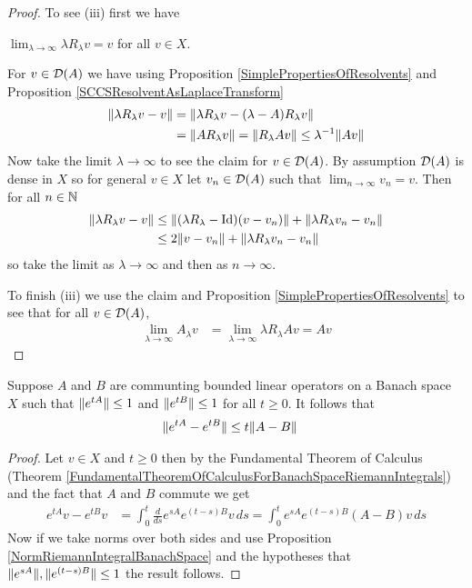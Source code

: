 \begin{proof}
To see (iii) first we have
\begin{clm}$\lim_{\lambda \to \infty} \lambda R_\lambda v = v$ for all $v \in X$.
\end{clm}
For $v \in \mathcal{D}(A)$ we have using Proposition \ref{SimplePropertiesOfResolvents} and Proposition \ref{SCCSResolventAsLaplaceTransform}
\begin{align*}
\lVert \lambda R_\lambda v - v \rVert &= \lVert \lambda R_\lambda v - (\lambda  -  A) R_\lambda v \rVert \\
&= \lVert A R_\lambda v \rVert = \lVert R_\lambda A v \rVert \leq \lambda^{-1} \lVert Av \rVert
\end{align*}
Now take the limit $\lambda \to \infty$ to see the claim for $v \in \mathcal{D}(A)$.  By assumption $\mathcal{D}(A)$ is dense in $X$ so for general $v \in X$ let $v_n \in \mathcal{D}(A)$ such
that $\lim_{n \to \infty} v_n = v$.  Then for all $n \in \mathbb{N}$
\begin{align*}
\lVert \lambda R_\lambda v - v \rVert &\leq \lVert (\lambda R_\lambda - \operatorname*{Id})(v - v_n) \rVert + \lVert \lambda R_\lambda v_n - v_n \rVert \\
&\leq 2 \lVert v-v_n \rVert + \lVert \lambda R_\lambda v_n - v_n \rVert
\end{align*}
so take the limit as $\lambda \to \infty$ and then as $n \to \infty$.  

To finish (iii) we use the claim and Proposition \ref{SimplePropertiesOfResolvents} to see that for all $v \in \mathcal{D}(A)$,
\begin{align*}
\lim_{\lambda \to \infty} A_\lambda v &= \lim_{\lambda \to \infty} \lambda R_\lambda A v = A v
\end{align*}
\end{proof}

\begin{lem}\label{SemigroupBoundInTermsOfBoundedGenerator}Suppose $A$ and $B$ are communting bounded linear operators on a Banach space $X$ such that $\lVert e^{tA} \rVert \leq 1$ and $\lVert e^{tB} \rVert \leq 1$ for all $t \geq 0$. It follows that
\begin{align*}
\lVert e^{tA} - e^{tB} \rVert &\leq t \lVert A-B \rVert
\end{align*}
\end{lem}
\begin{proof}
Let $v \in X$ and $t \geq 0$ then by the Fundamental Theorem of Calculus (Theorem \ref{FundamentalTheoremOfCalculusForBanachSpaceRiemannIntegrals}) and the fact that $A$ and $B$ commute we get
\begin{align*}
e^{tA}v  - e^{tB} v &= \int_0^t \frac{d}{ds} e^{sA} e^{(t-s)B} v \, ds = \int_0^t e^{sA} e^{(t-s)B} (A-B) v \, ds
\end{align*}
Now if we take norms over both sides and use Proposition \ref{NormRiemannIntegralBanachSpace} and the hypotheses that $\lVert e^{sA} \rVert, \lVert e^{(t-s)B} \rVert \leq 1$ the result follows.
\end{proof}

